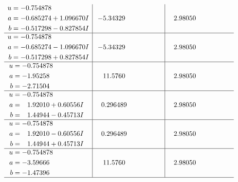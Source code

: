 \documentclass[1p]{elsarticle_modified}
\theoremstyle{definition}
\begin{document}
$$\begin{array}{c|c|c}
\begin{aligned}
u &= -0.754878\phantom{ +0.000000I} \\
a &= -0.685274 + 1.096670 I \\
b &= -0.517298 - 0.827854 I\end{aligned}
 & -5.34329\phantom{ +0.000000I} & \phantom{-}2.98050\phantom{ +0.000000I} \\ \hline\begin{aligned}
u &= -0.754878\phantom{ +0.000000I} \\
a &= -0.685274 - 1.096670 I \\
b &= -0.517298 + 0.827854 I\end{aligned}
 & -5.34329\phantom{ +0.000000I} & \phantom{-}2.98050\phantom{ +0.000000I} \\ \hline\begin{aligned}
u &= -0.754878\phantom{ +0.000000I} \\
a &= -1.95258\phantom{ +0.000000I} \\
b &= -2.71504\phantom{ +0.000000I}\end{aligned}
 & \phantom{-}11.5760\phantom{ +0.000000I} & \phantom{-}2.98050\phantom{ +0.000000I} \\ \hline\begin{aligned}
u &= -0.754878\phantom{ +0.000000I} \\
a &= \phantom{-}1.92010 + 0.60556 I \\
b &= \phantom{-}1.44944 - 0.45713 I\end{aligned}
 & \phantom{-}0.296489\phantom{ +0.000000I} & \phantom{-}2.98050\phantom{ +0.000000I} \\ \hline\begin{aligned}
u &= -0.754878\phantom{ +0.000000I} \\
a &= \phantom{-}1.92010 - 0.60556 I \\
b &= \phantom{-}1.44944 + 0.45713 I\end{aligned}
 & \phantom{-}0.296489\phantom{ +0.000000I} & \phantom{-}2.98050\phantom{ +0.000000I} \\ \hline\begin{aligned}
u &= -0.754878\phantom{ +0.000000I} \\
a &= -3.59666\phantom{ +0.000000I} \\
b &= -1.47396\phantom{ +0.000000I}\end{aligned}
 & \phantom{-}11.5760\phantom{ +0.000000I} & \phantom{-}2.98050\phantom{ +0.000000I}\\
 \hline 
 \end{array}$$\newpage
\newpage\renewcommand{\arraystretch}{1}
\end{document}
